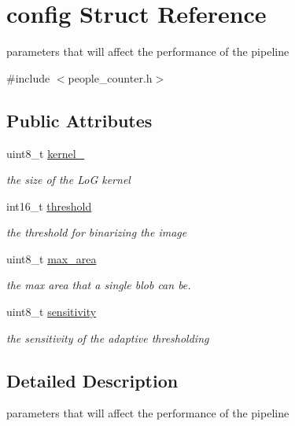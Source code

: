 \hypertarget{structconfig}{}\section{config Struct Reference}
\label{structconfig}


parameters that will affect the performance of the pipeline  




{\ttfamily \#include $<$people\+\_\+counter.\+h$>$}

\subsection*{Public Attributes}
\begin{DoxyCompactItemize}
\item 
\mbox{\label{structconfig_a82c79528c83c09c93c04a3c54982fc24}} 
uint8\+\_\+t \mbox{\hyperlink{structconfig_a82c79528c83c09c93c04a3c54982fc24}{kernel\+\_}}
\begin{DoxyCompactList}\small\item\em the size of the LoG kernel \end{DoxyCompactList}\item 
int16\+\_\+t \mbox{\hyperlink{structconfig_ae0c9e09ec87f1a408ec356df5f468118}{threshold}}
\begin{DoxyCompactList}\small\item\em the threshold for binarizing the image \end{DoxyCompactList}\item 
uint8\+\_\+t \mbox{\hyperlink{structconfig_a7b01db4f29befbf3cc2925748fa3014a}{max\+\_\+area}}
\begin{DoxyCompactList}\small\item\em the max area that a single blob can be. \end{DoxyCompactList}\item 
uint8\+\_\+t \mbox{\hyperlink{structconfig_a91f6a75cc3ae6447712700387e89a9c2}{sensitivity}}
\begin{DoxyCompactList}\small\item\em the sensitivity of the adaptive thresholding \end{DoxyCompactList}\end{DoxyCompactItemize}


\subsection{Detailed Description}
parameters that will affect the performance of the pipeline 

